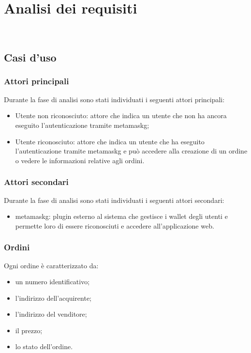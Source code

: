 
\chapter{Analisi dei requisiti}
\label{cap:analisi-requisiti}

\\

\section{Casi d'uso}

\subsection{Attori principali}
Durante la fase di analisi sono stati individuati i seguenti attori principali:
\begin{itemize}
    \item Utente non riconosciuto: attore che indica un utente che non ha ancora eseguito l'autenticazione tramite \gls{metamaskg};
    \item Utente riconosciuto: attore che indica un utente che ha eseguito l'autenticazione tramite \gls{metamaskg} e può accedere alla creazione di un ordine o vedere le informazioni relative agli ordini.
\end{itemize}

\subsection{Attori secondari}
Durante la fase di analisi sono stati individuati i seguenti attori secondari:
\begin{itemize}
    \item \gls{metamaskg}: plugin esterno al sistema che gestisce i wallet degli utenti e permette loro di essere riconosciuti e accedere all'applicazione web.
\end{itemize}

\subsection{Ordini}
Ogni ordine è caratterizzato da:
\begin{itemize}
    \item un numero identificativo;
    \item l'indirizzo dell'acquirente;
    \item l'indirizzo del venditore;
    \item il prezzo;
    \item lo stato dell'ordine.
\end{itemize}

